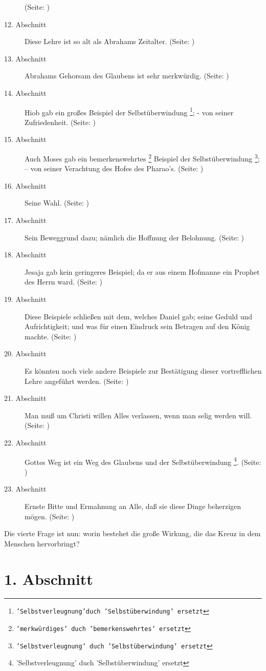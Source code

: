 \begin{description}
(Seite: \pageref{kap4_ab11})
\item[12. Abschnitt] Diese Lehre ist so alt als Abrahams Zeitalter. (Seite:
\pageref{kap4_ab12})
\item[13. Abschnitt] Abrahams Gehorsam des Glaubens ist sehr merkwürdig. (Seite:
\pageref{kap4_ab13})
\item[14. Abschnitt] Hiob gab ein großes Beispiel der Selbstüberwindung
\footnote{\texttt{'Selbstverleugnung'duch 'Selbstüberwindung' ersetzt}}; - von
seiner Zufriedenheit. (Seite: \pageref{kap4_ab14})
\item[15. Abschnitt] Auch Moses gab ein bemerkenswehrtes
\footnote{\texttt{'merkwürdiges' duch 'bemerkenswehrtes' ersetzt}} Beispiel der
Selbstüberwindung \footnote{\texttt{'Selbstverleugnung' duch 'Selbstüberwindung'
ersetzt}}; -- von seiner Verachtung des Hofes des Pharao's. (Seite:
\pageref{kap4_ab15})
\item[16. Abschnitt] Seine Wahl. (Seite: \pageref{kap4_ab16})
\item[17. Abschnitt] Sein Beweggrund dazu; nämlich die Hoffnung der Belohnung.
(Seite: \pageref{kap4_ab17})
\item[18. Abschnitt] Jesaja gab kein geringeres Beispiel; da er aus einem
Hofmanne ein Prophet des Herrn ward. (Seite: \pageref{kap4_ab18})
\item[19. Abschnitt] Diese Beispiele schließen mit dem, welches Daniel gab;
seine Geduld und Aufrichtigkeit; und was für einen Eindruck sein Betragen auf
den König machte. (Seite: \pageref{kap4_ab19})
\item[20. Abschnitt] Es könnten noch viele andere Beispiele zur Bestätigung
dieser vortrefflichen Lehre angeführt werden. (Seite: \pageref{kap4_ab20})
\item[21. Abschnitt] Man muß um Christi willen Alles verlassen, wenn man selig
werden will. (Seite: \pageref{kap4_ab21})
\item[22. Abschnitt] Gottes Weg ist ein Weg des Glaubens und der
Selbstüberwindung \footnote{'Selbstverleugnung' duch 'Selbstüberwindung'
ersetzt}. (Seite: \pageref{kap4_ab22})
\item[23. Abschnitt] Ernste Bitte und Ermahnung an Alle, daß sie diese Dinge
beherzigen mögen. (Seite: \pageref{kap4_ab23})
\end{description}
\normalsize


Die vierte Frage ist nun: worin bestehet die große Wirkung, die das Kreuz in dem
Menschen hervorbringt?

\section{1. Abschnitt} \label{kap4_ab1}

